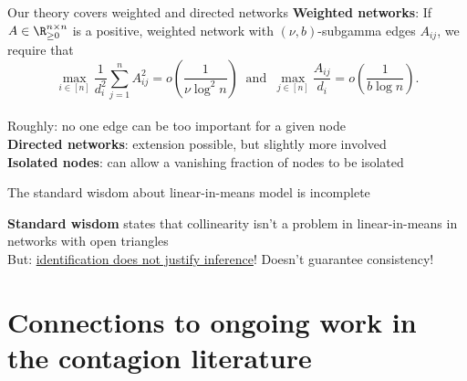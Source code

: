 \documentclass[aspectratio=169]{beamer}
\theoremstyle{remark}
\begin{document}
\begin{frame}{Our theory covers weighted and directed networks}
    \textbf{Weighted networks}: If $A \in \R^{n \times n}_{\ge 0}$ is a positive, weighted network with $(\nu, b)$-subgamma edges $A_{ij}$, we require that
    \begin{equation*}
        \max_{i \in [n]} \frac{1}{d_i^2} \sum_{j=1}^n A_{ij}^2
        = o\left( \frac{ 1 }{ \nu \log^2 n } \right)
        ~\text{ and }~
        \max_{j \in [n]} \frac{ A_{ij} }{ d_i }
        = o\left( \frac{ 1 }{ b \log n } \right).
    \end{equation*} \\
    Roughly: no one edge can be too important for a given node \\
    \vspace{4mm}
    \textbf{Directed networks}: extension possible, but slightly more involved \\
    \vspace{4mm}
    \textbf{Isolated nodes}: can allow a vanishing fraction of nodes to be isolated
\end{frame}


\begin{frame}{The standard wisdom about linear-in-means model is incomplete}
    
    \textbf{Standard wisdom} states that collinearity isn't a problem in linear-in-means in networks with open triangles \citep{bramoulle2009} \\
    
    \vspace{4mm}
    But: \underline{identification does not justify inference}! Doesn't guarantee consistency! \\
    
\end{frame}

\section{Connections to ongoing work in the contagion literature}




\end{document}
